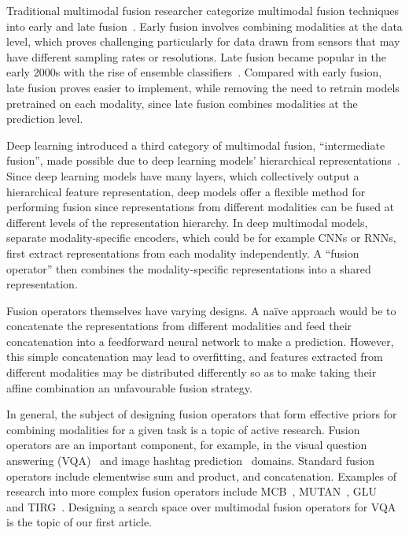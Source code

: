 Traditional multimodal fusion researcher categorize multimodal fusion
techniques into early and late fusion~\cite{ramachandram2017deepmultimodal}.
Early fusion involves combining modalities at the data level, which proves
challenging particularly for data drawn from sensors that may have different
sampling rates or resolutions.
Late fusion became popular in the early 2000s with the rise of ensemble
classifiers~\cite{kuncheva2004combining}.
Compared with early fusion, late fusion proves easier to implement, while
removing the need to retrain models pretrained on each modality, since late
fusion combines modalities at the prediction level.

Deep learning introduced a third category of multimodal fusion, ``intermediate
fusion'', made possible due to deep learning models' hierarchical
representations~\cite{ramachandram2017deepmultimodal}.
Since deep learning models have many layers, which collectively output a
hierarchical feature representation, deep models offer a flexible method for
performing fusion since representations from different modalities can be fused
at different levels of the representation hierarchy.
In deep multimodal models, separate modality-specific encoders, which could be
for example CNNs or RNNs, first extract representations from each modality
independently.
A ``fusion operator'' then combines the modality-specific representations into
a shared representation.

Fusion operators themselves have varying designs. A na\"ive approach would be to
concatenate the representations from different modalities and feed their
concatenation into a feedforward neural network to make a prediction.
However, this simple concatenation may lead to overfitting, and features
extracted from different modalities may be distributed differently so as to
make taking their affine combination an unfavourable fusion strategy.

In general, the subject of designing fusion operators that form effective
priors for combining modalities for a given task is a topic of active research.
Fusion operators are an important component, for example, in the visual
question answering (VQA)~\cite{fukui2016multimodalCB} and image hashtag
prediction~\cite{durand2020learninguserreps} domains.
Standard fusion operators include elementwise sum and product, and
concatenation.
Examples of research into more complex fusion operators include
MCB~\cite{fukui2016multimodalCB}, MUTAN~\cite{ben2017mutan},
GLU~\cite{dauphin2017languagemodeling} and TIRG~\cite{vo2019composing}.
Designing a search space over multimodal fusion operators for VQA is the topic
of our first article.
